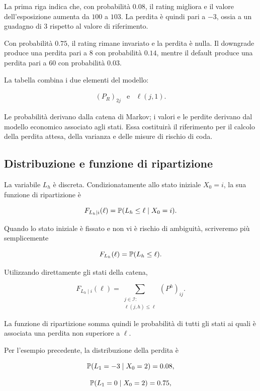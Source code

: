 La prima riga indica che, con probabilit\`{a} $0.08$, il rating
migliora e il valore dell'esposizione aumenta da $100$ a $103$.
La perdita \`{e} quindi pari a $-3$, ossia a un guadagno di $3$
rispetto al valore di riferimento.

Con probabilit\`{a} $0.75$, il rating rimane invariato e la perdita
\`{e} nulla. Il downgrade produce una perdita pari a $8$ con
probabilit\`{a} $0.14$, mentre il default produce una perdita pari a
$60$ con probabilit\`{a} $0.03$.

La tabella combina i due elementi del modello:

\[
\begin{array}{ccc}
(P_R)_{2j}
&
\text{e}
&
\ell(j,1).
\end{array}
\]

Le probabilit\`{a} derivano dalla catena di Markov; i valori e le
perdite derivano dal modello economico associato agli stati. Essa
costituir\`{a} il riferimento per il calcolo della perdita attesa,
della varianza e delle misure di rischio di coda.

\subsection{Distribuzione e funzione di ripartizione}

\label{subsec:cap9-distribuzione-perdita}

La variabile $L_h$ \`{e} discreta. Condizionatamente allo stato
iniziale $X_0=i$, la sua funzione di ripartizione \`{e}

\[
F_{L_h\mid i}(\ell)
=
\mathbb{P}(L_h\leq\ell\mid X_0=i).
\]

Quando lo stato iniziale \`{e} fissato e non vi \`{e} rischio di
ambiguit\`{a}, scriveremo pi\`{u} semplicemente

\[
F_{L_h}(\ell)
=
\mathbb{P}(L_h\leq\ell).
\]

Utilizzando direttamente gli stati della catena,

\[
F_{L_h\mid i}(\ell)
=
\sum_{\substack{j\in\mathcal{I}:\\
\ell(j,h)\leq\ell}}
(P^h)_{ij}.
\]

La funzione di ripartizione somma quindi le probabilit\`{a} di tutti
gli stati ai quali \`{e} associata una perdita non superiore a
$\ell$.

Per l'esempio precedente, la distribuzione della perdita \`{e}

\[
\mathbb{P}(L_1=-3\mid X_0=2)=0.08,
\]

\[
\mathbb{P}(L_1=0\mid X_0=2)=0.75,
\]

